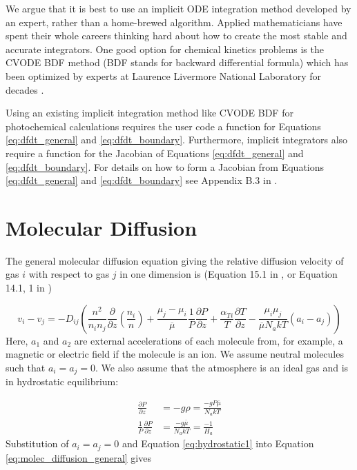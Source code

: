 We argue that it is best to use an implicit ODE integration method developed by an expert, rather than a home-brewed algorithm. Applied mathematicians have spent their whole careers thinking hard about how to create the most stable and accurate integrators. One good option for chemical kinetics problems is the CVODE BDF method (BDF stands for backward differential formula) which has been optimized by experts at Laurence Livermore National Laboratory for decades \citep{Hindmarsh_2005}.

Using an existing implicit integration method like CVODE BDF for photochemical calculations requires the user code a function for Equations \eqref{eq:dfdt_general} and \eqref{eq:dfdt_boundary}. Furthermore, implicit integrators also require a function for the Jacobian of Equations \eqref{eq:dfdt_general} and \eqref{eq:dfdt_boundary}. For details on how to form a Jacobian from Equations \eqref{eq:dfdt_general} and \eqref{eq:dfdt_boundary} see Appendix B.3 in \citet{Catling_2017}.

\section{Molecular Diffusion} \label{sec:molecular_diffusion}

The general molecular diffusion equation giving the relative diffusion velocity of gas $i$ with respect to gas $j$ in one dimension is (Equation 15.1 in \citet{Banks_2013}, or Equation 14.1, 1 in \citet{Chapman_1990})

\begin{equation} \label{eq:molec_diffusion_general}
  v_i - v_j = -D_{ij} \left( \frac{n^2}{n_i n_j} \frac{\partial}{\partial z} \left(\frac{n_i}{n}\right) + \frac{\mu_j - \mu_i}{\overline{\mu}} \frac{1}{P} \frac{\partial P}{\partial z} + \frac{\alpha_{Ti}}{T} \frac{\partial T}{\partial z} - \frac{\mu_i \mu_j}{\overline{\mu} N_a k T} (a_i - a_j)\right)
\end{equation}
Here, $a_1$ and $a_2$ are external accelerations of each molecule from, for example, a magnetic or electric field if the molecule is an ion. We assume neutral molecules such that $a_i = a_j = 0$. We also assume that the atmosphere is an ideal gas and is in hydrostatic equilibrium:

\begin{align} 
  \frac{\partial P}{\partial z} &= -g \rho = \frac{-g P \overline{\mu}}{N_a k T} \\
  \frac{1}{P}\frac{\partial P}{\partial z} &= \frac{-g \overline{\mu}}{N_a k T} = \frac{-1}{H_a} \label{eq:hydrostatic1}
\end{align}
Substitution of $a_i = a_j = 0$ and Equation \eqref{eq:hydrostatic1} into Equation \eqref{eq:molec_diffusion_general} gives

